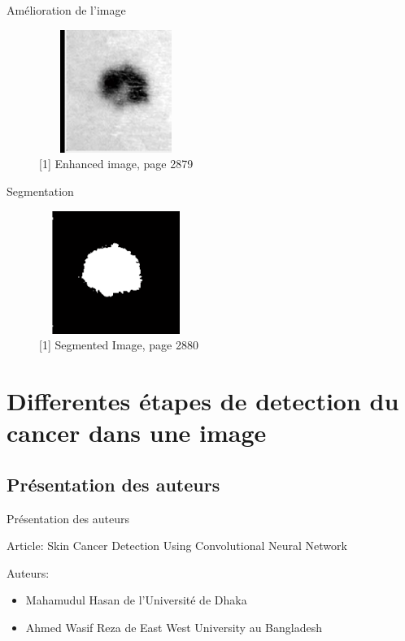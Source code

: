 \documentclass{beamer}
\begin{document}
\begin{frame}{Amélioration de l’image}
		\begin{figure}[H]
    \includegraphics[width=5cm,height=4cm]{images/input_4.png}
    \caption{[1] Enhanced image, page 2879}
    \label{fig:L1}
\end{figure}
\end{frame}
\begin{frame}{Segmentation}
		\begin{figure}[H]
    \includegraphics[width=5cm,height=4cm]{images/input_5.png}
    \caption{[1] Segmented Image, page 2880}
    \label{fig:L1}
\end{figure}
\end{frame}

\section{Differentes étapes de detection du cancer dans une image}  
\subsection{Présentation des auteurs}

\begin{frame}{Présentation des auteurs}
\par Article:  Skin Cancer Detection Using Convolutional Neural Network
\par Auteurs:
\begin{itemize}
		\item Mahamudul Hasan de l’Université de Dhaka
		\item Ahmed Wasif Reza de East West University au Bangladesh
\end{itemize}
\end{frame}
\end{document}
